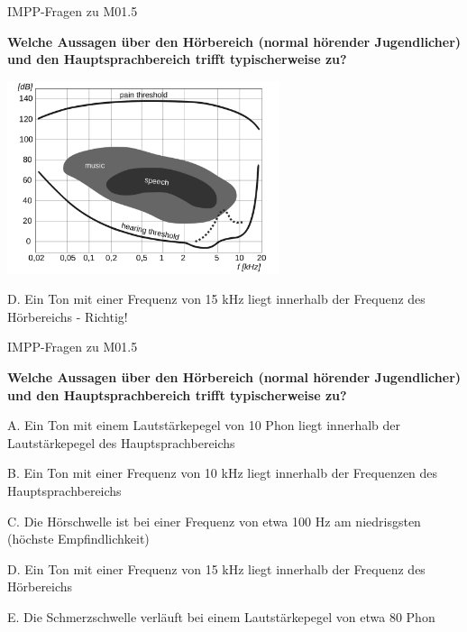 \documentclass{beamer}
\begin{document}
\begin{frame}{IMPP-Fragen zu M01.5}
    
  \textbf{
Welche Aussagen über den Hörbereich (normal hörender Jugendlicher) und den Hauptsprachbereich trifft typischerweise zu?
  } \\[0.2 cm]



\begin{center}
          \includegraphics[width=0.6\textwidth]{hoerflaeche.png}
\end{center}

\begin{description}
\item{D.} Ein Ton mit einer Frequenz von 15 kHz liegt innerhalb der Frequenz des Hörbereichs \pause - Richtig!
\end{description}  



\end{frame}

\begin{frame}{IMPP-Fragen zu M01.5}
    
   \textbf{
Welche Aussagen über den Hörbereich (normal hörender Jugendlicher) und den Hauptsprachbereich trifft typischerweise zu?
   } \\[0.2 cm]

\begin{description}
\item{A.} Ein Ton mit einem Lautstärkepegel von 10 Phon liegt innerhalb der Lautstärkepegel des Hauptsprachbereichs
\item{B.}  Ein Ton mit einer Frequenz von 10 kHz liegt innerhalb der Frequenzen des Hauptsprachbereichs
\item{C.} Die Hörschwelle ist bei einer Frequenz von etwa 100 Hz am niedrisgsten (höchste Empfindlichkeit)
\item{D.} \textcolor{theme}{Ein Ton mit einer Frequenz von 15 kHz liegt innerhalb der Frequenz des Hörbereichs}
\item{E.} Die Schmerzschwelle verläuft bei einem Lautstärkepegel von etwa 80 Phon
\end{description}  
    
\end{frame}
\end{document}
